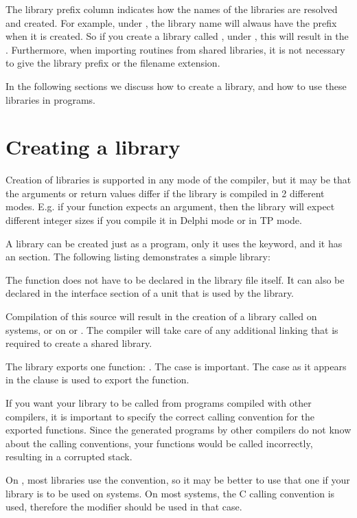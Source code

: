 The library prefix column indicates how the names of the libraries are
resolved and created. For example, under \linux, the library name will
alwaus have the  prefix when it is created. So if you create a
library called , under \linux, this will result in the
. Furthermore, when importing routines from shared
libraries, it is not necessary to give the library prefix or the
filename extension.

In the following sections we discuss how to create a library, and how
to use these libraries in programs.

\section{Creating a library}

Creation of libraries is supported in any mode of the \fpc compiler,
but it may be that the arguments or return values differ if the library is
compiled in 2 different modes.  E.g. if your function expects an
 argument, then the library will expect different integer
sizes if you compile it in Delphi mode or in TP mode.

A library can be created just as a program, only it uses the 
keyword, and it has an  section. The following listing
demonstrates a simple library:


The function  does not have to be declared in the library file
itself. It can also be declared in the interface section of a unit that
is used by the library.

Compilation of this source will result in the creation of a library called
 on \unix systems, or  on \windows or \ostwo.
The compiler will take care of any additional linking that is required to create a
shared library.

The library exports one function: . The case is important. The
case as it appears in the  clause is used to export the
function.

If you want your library to be called from programs compiled with
other compilers, it is important to specify the correct calling
convention for the exported functions. Since the generated programs
by other compilers do not know about the \fpc calling conventions,
your functions would be called incorrectly, resulting in a corrupted
stack.


On \windows, most libraries use the  convention, so it may be
better to use that one if your library is to be used on \windows systems. On
most \unix systems, the C calling convention is used, therefore the
 modifier should be used in that case.

